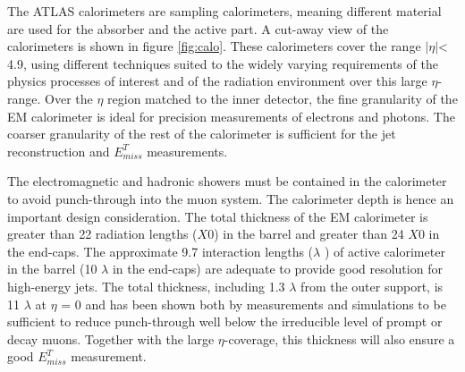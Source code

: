 \documentclass[letterpaper,12pt]{article}
\begin{document}
	The ATLAS calorimeters are sampling calorimeters, meaning
	different material are used for the absorber and the active part.
	A cut-away view of the calorimeters is shown in figure \ref{fig:calo}.
	These calorimeters cover the range $|\eta|$< 4.9, using 
	different techniques suited to the widely varying requirements 
	of the physics processes of interest and of the radiation environment
	over this large $\eta$-range. Over the $\eta$ region matched to 
	the inner detector, the fine granularity of	the EM calorimeter 
	is ideal for precision measurements of electrons and photons. The
	coarser granularity of the rest of the calorimeter is sufficient 
	for the jet reconstruction and $E_{miss}^T$ measurements.

	The electromagnetic and hadronic showers must be contained in the 
	calorimeter to avoid punch-through into the muon system. 
	The calorimeter depth is hence an important design consideration. 
	The total thickness of the EM calorimeter is greater than
	22 radiation lengths ($X0$) in the barrel and greater than 
	24 $X0$ in the end-caps. The approximate 9.7 interaction 
	lengths ($\lambda$ ) of active calorimeter in 
	the barrel (10 $\lambda$ in the end-caps) are adequate to 
	provide good resolution for high-energy jets. The total thickness, 
	including 1.3 $\lambda$ from the outer support, is 11 $\lambda$
	at $\eta$ = 0 and has been shown both by measurements and simulations 
	to be sufficient to reduce punch-through well below the irreducible 
	level of prompt or decay muons. Together with the large
	$\eta$-coverage, this thickness will also ensure a good $E_{miss}^T$ 
	measurement.
\end{document}
